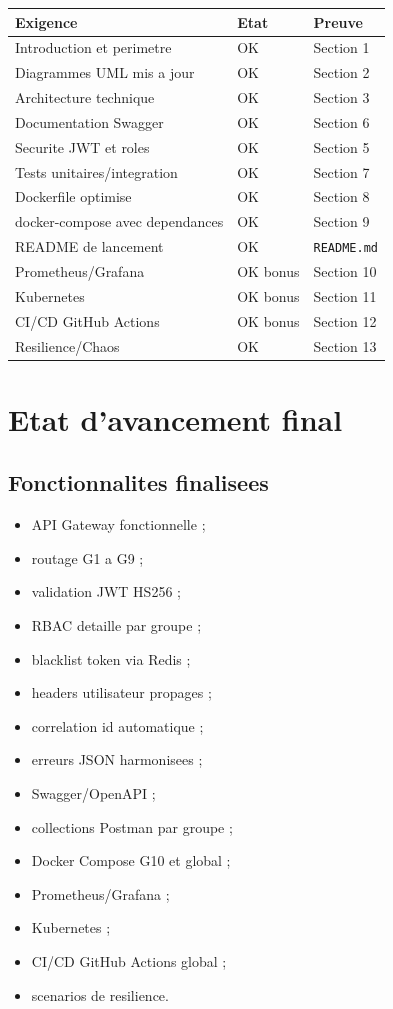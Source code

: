 \documentclass[12pt,a4paper]{article}
\begin{document}
\begin{longtable}{p{8cm}p{3cm}p{4cm}}
\toprule
\textbf{Exigence} & \textbf{Etat} & \textbf{Preuve} \\
\midrule
Introduction et perimetre & OK & Section 1 \\
Diagrammes UML mis a jour & OK & Section 2 \\
Architecture technique & OK & Section 3 \\
Documentation Swagger & OK & Section 6 \\
Securite JWT et roles & OK & Section 5 \\
Tests unitaires/integration & OK & Section 7 \\
Dockerfile optimise & OK & Section 8 \\
docker-compose avec dependances & OK & Section 9 \\
README de lancement & OK & \texttt{README.md} \\
Prometheus/Grafana & OK bonus & Section 10 \\
Kubernetes & OK bonus & Section 11 \\
CI/CD GitHub Actions & OK bonus & Section 12 \\
Resilience/Chaos & OK & Section 13 \\
\bottomrule
\end{longtable}

\newpage

\section{Etat d'avancement final}

\subsection{Fonctionnalites finalisees}

\begin{itemize}
  \item API Gateway fonctionnelle ;
  \item routage G1 a G9 ;
  \item validation JWT HS256 ;
  \item RBAC detaille par groupe ;
  \item blacklist token via Redis ;
  \item headers utilisateur propages ;
  \item correlation id automatique ;
  \item erreurs JSON harmonisees ;
  \item Swagger/OpenAPI ;
  \item collections Postman par groupe ;
  \item Docker Compose G10 et global ;
  \item Prometheus/Grafana ;
  \item Kubernetes ;
  \item CI/CD GitHub Actions global ;
  \item scenarios de resilience.
\end{itemize}
\end{document}
